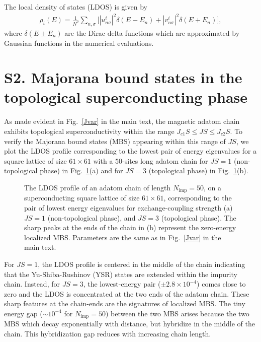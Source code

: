 \documentclass[aps,prl,reprint,nobibnotes]{revtex4-1}
\begin{document}
The local density of states (LDOS) is given by
\begin{align}
\rho_i(E)=\frac{1}{N^2} \sum_{n,\sigma}  \Big[ |u_{n\sigma}^{i}|^2\delta(E-E_n)+|v_{n\sigma}^{i}|^2\delta(E+E_n)  \Big],
\end{align}
\noindent where $\delta(E \pm E_n)$ are the Dirac delta functions which are approximated by Gaussian functions in the numerical evaluations.


\section{S2. Majorana bound states in the topological superconducting phase}
As made evident in Fig.~\ref{Jvar} in the main text, the magnetic adatom chain exhibits topological superconductivity within the range $J_{c1}S \leq JS \leq J_{c2}S$. To verify the Majorana bound states (MBS) appearing within this range of $JS$, we plot the LDOS profile corresponding to the lowest pair of energy eigenvalues for a square lattice of size $61 \times 61$ with a $50$-sites long adatom chain for $JS=1$ (non-topological phase) in Fig.~\ref{ldos}(a) and for $JS=3$ (topological phase) in Fig.~\ref{ldos}(b).
\begin{figure}[h!]
\begin{center}
\caption{The LDOS profile of an adatom chain of length $N_{\text{imp}}=50$, on a superconducting square lattice of size $61 \times 61$, corresponding to the pair of lowest energy eigenvalues for exchange-coupling strength (a) $JS=1$ (non-topological phase), and $JS=3$ (topological phase). The sharp peaks at the ends of the chain in (b) represent the zero-energy localized MBS. Parameters are the same as in Fig.~\ref{Jvar} in the main text.} 
\label{ldos}
\end{center}
\end{figure}
For $JS=1$, the LDOS profile is centered in the middle of the chain indicating that the Yu-Shiba-Rushinov (YSR) states are extended within the impurity chain. Instead, for $JS=3$, the lowest-energy pair ($\pm2.8\times10^{-4}$) comes close to zero and the LDOS is concentrated at the two ends of the adatom chain. These sharp features at the chain-ends are the signatures of localized MBS. The tiny energy gap ($\sim 10^{-4}$ for $N_{\text{imp}}=50$) between the two MBS arises because the two MBS which decay exponentially with distance, but hybridize in the middle of the chain. This hybridization gap reduces with increasing chain length.
\end{document}
